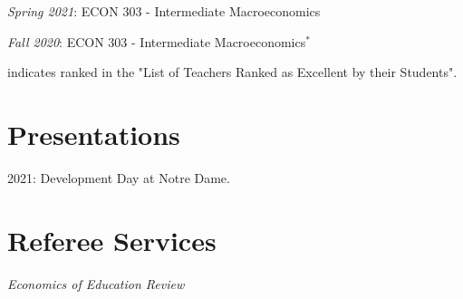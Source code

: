 \documentclass[letterpaper,11pt]{article}
\begin{document}
\begin{adjustwidth}{9mm}{0mm}
  \textit{Spring 2021}: ECON 303 - Intermediate Macroeconomics
\end{adjustwidth}

\begin{adjustwidth}{9mm}{0mm}
  \textit{Fall 2020}: ECON 303 - Intermediate Macroeconomics$^*$
\end{adjustwidth}

\vspace{5mm}

\begin{adjustwidth}{3mm}{0mm}
  \scriptsize * indicates ranked in the "List of Teachers Ranked as Excellent by their Students".
\end{adjustwidth}


\section{Presentations}
\begin{adjustwidth}{3mm}{0mm}
  2021: Development Day at Notre Dame.
\end{adjustwidth}

\section{Referee Services}
\begin{adjustwidth}{3mm}{0mm}
\textit{Economics of Education Review}
\end{adjustwidth}
\end{document}
